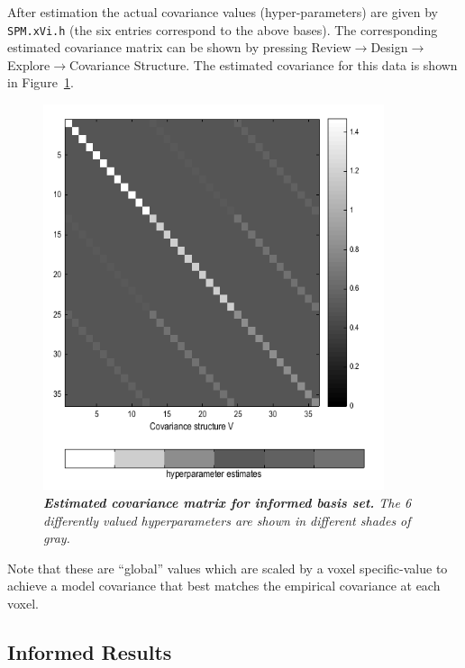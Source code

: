 After estimation the actual covariance values (hyper-parameters) are given by \texttt{SPM.xVi.h} (the six entries correspond to the above bases). The corresponding estimated covariance matrix can be shown by pressing Review$\rightarrow$Design$\rightarrow$Explore$\rightarrow$Covariance Structure. The estimated covariance for this data is shown in Figure~\ref{informed_covariance}.
\begin{figure}
\begin{center}
\includegraphics[width=100mm]{faces_group/informed_covariance}
\caption{\em \textbf{Estimated covariance matrix for informed basis set.} The 6 differently valued hyperparameters are shown in different shades of gray. \label{informed_covariance}}
\end{center}
\end{figure}
Note that these are ``global'' values which are scaled by a voxel specific-value to achieve a model covariance that best matches the empirical covariance at each voxel. 

\subsection{Informed Results}

